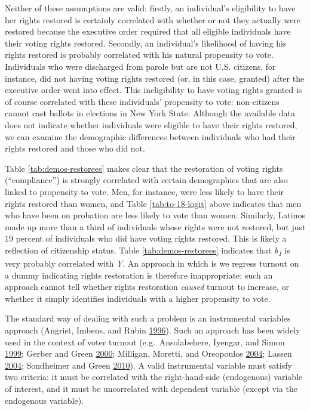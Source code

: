 \documentclass[
  12pt,
]{article}
\begin{document}
Neither of these assumptions are valid: firstly, an individual's eligibility to have her rights restored is certainly correlated with whether or not they actually were restored because the executive order required that all eligible individuals have their voting rights restored. Secondly, an individual's likelihood of having his rights restored is probably correlated with his natural propensity to vote. Individuals who were discharged from parole but are not U.S. citizens, for instance, did not having voting rights restored (or, in this case, granted) after the executive order went into effect. This ineligibility to have voting rights granted is of course correlated with these individuals' propensity to vote: non-citizens cannot cast ballots in elections in New York State. Although the available data does not indicate whether individuals were eligible to have their rights restored, we can examine the demographic differences between individuals who had their rights restored and those who did not.



Table \ref{tab:demos-restorees} makes clear that the restoration of voting rights (``compliance'') is strongly correlated with certain demographics that are also linked to propensity to vote. Men, for instance, were less likely to have their rights restored than women, and Table \ref{tab:to-18-logit} above indicates that men who have been on probation are less likely to vote than women. Similarly, Latinos made up more than a third of individuals whose rights were not restored, but just 19 percent of individuals who did have voting rights restored. This is likely a reflection of citizenship status. Table \ref{tab:demos-restorees} indicates that \emph{b\textsubscript{1}} is very probably correlated with \emph{Y}. An approach in which is we regress turnout on a dummy indicating rights restoration is therefore inappropriate: such an approach cannot tell whether rights restoration \emph{caused} turnout to increase, or whether it simply identifies individuals with a higher propensity to vote.

The standard way of dealing with such a problem is an instrumental variables approach (Angrist, Imbens, and Rubin \protect\hyperlink{ref-Angrist1996}{1996}). Such an approach has been widely used in the context of voter turnout (e.g.~Ansolabehere, Iyengar, and Simon \protect\hyperlink{ref-Ansolabehere1999}{1999}; Gerber and Green \protect\hyperlink{ref-Gerber2000}{2000}; Milligan, Moretti, and Oreopoulos \protect\hyperlink{ref-Milligan2004}{2004}; Lassen \protect\hyperlink{ref-Lassen2004}{2004}; Sondheimer and Green \protect\hyperlink{ref-Sondheimer2010}{2010}). A valid instrumental variable must satisfy two criteria: it must be correlated with the right-hand-side (endogenous) variable of interest, and it must be uncorrelated with dependent variable (except via the endogenous variable).
\end{document}
